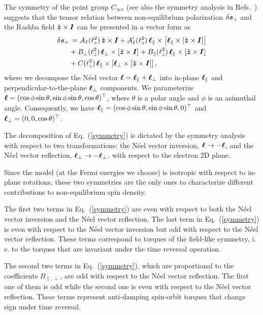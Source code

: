The symmetry of the point group $C_{\infty\textrm{v}}$ (see also the symmetry analysis in Refs.~) suggests that the tensor relation between non-equilibrium polarization $\delta\boldsymbol{s}_+$ and the Rashba field $\hat{\boldsymbol{z}}\times \boldsymbol{I}$ can be presented in a vector form as 
\begin{align}
\delta\boldsymbol{s}_+&\,= A_I(\ell_z^2)\,\hat{\boldsymbol{z}}\times \boldsymbol{I} + A'_I(\ell_z^2)\,\boldsymbol{\ell}_\parallel\times \left[\boldsymbol{\ell}_\parallel\times \left[\hat{\boldsymbol{z}}\times \boldsymbol{I}\right]\right]\nonumber\\
&+ B_\perp(\ell_z^2)\,\boldsymbol{\ell}_\perp\times \left[\hat{\boldsymbol{z}}\times \boldsymbol{I}\right]+B_\parallel(\ell_z^2)\,\boldsymbol{\ell}_\parallel\times \left[\hat{\boldsymbol{z}}\times \boldsymbol{I}\right]\nonumber\\
&+ C(\ell_z^2)\,\boldsymbol{\ell}_\parallel\times \left[\boldsymbol{\ell}_\perp\times \left[\hat{\boldsymbol{z}}\times \boldsymbol{I}\right]\right],
\label{symmetry}
\end{align}
where we decompose the N\'eel vector $\boldsymbol{\ell}=\boldsymbol{\ell}_\parallel+\boldsymbol{\ell}_\perp$ into in-plane $\boldsymbol{\ell}_\parallel$ and perpendicular-to-the-plane $\boldsymbol{\ell}_\perp$ components. We parameterize $\boldsymbol{\ell}=(\cos\phi\sin\theta,\sin\phi\sin\theta,\cos\theta)^\top$, where $\theta$ is a polar angle and $\phi$ is an azimuthal angle. Consequently, we have $\boldsymbol{\ell}_\parallel=(\cos\phi\sin\theta,\sin\phi\sin\theta,0)^\top$ and $\boldsymbol{\ell}_\perp=(0,0,\cos\theta)^\top$.

The decomposition of Eq.~(\ref{symmetry}) is dictated by the symmetry analysis with respect to two transformations: the N\'eel vector inversion, $\boldsymbol{\ell}\to -\boldsymbol{\ell}$, and the N\'eel vector reflection, $\boldsymbol{\ell}_\perp\to -\boldsymbol{\ell}_\perp$, with respect to the electron 2D plane. 

Since the model (at the Fermi energies we choose) is isotropic with respect to in-plane rotations, these two symmetries are the only ones to characterize different contributions to non-equilibrium spin density. 

The first two terms in Eq.~(\ref{symmetry}) are even with respect to both the N\'eel vector inversion and the N\'eel vector reflection. The last term in Eq.~(\ref{symmetry}) is even with respect to the N\'eel vector inversion but odd with respect to the N\'eel vector reflection. These terms correspond to torques of the field-like symmetry, i.\,e. to the torques that are invariant under the time reversal operation. 

The second two terms in Eq.~(\ref{symmetry}), which are proportional to the coefficients $B_{\parallel,\perp}$, are odd with respect to the N\'eel vector reflection. The first one of them is odd while the second one is even with respect to the N\'eel vector reflection. These terms represent anti-damping spin-orbit torques that change sign under time reversal.

